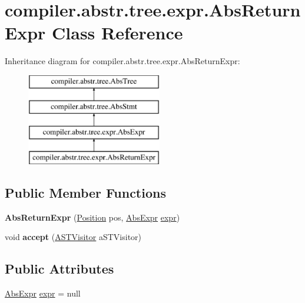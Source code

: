 \hypertarget{classcompiler_1_1abstr_1_1tree_1_1expr_1_1_abs_return_expr}{}\section{compiler.\+abstr.\+tree.\+expr.\+Abs\+Return\+Expr Class Reference}
\label{classcompiler_1_1abstr_1_1tree_1_1expr_1_1_abs_return_expr}
Inheritance diagram for compiler.\+abstr.\+tree.\+expr.\+Abs\+Return\+Expr\+:\begin{figure}[H]
\begin{center}
\leavevmode
\includegraphics[height=4.000000cm]{classcompiler_1_1abstr_1_1tree_1_1expr_1_1_abs_return_expr}
\end{center}
\end{figure}
\subsection*{Public Member Functions}
\begin{DoxyCompactItemize}
\item 
\mbox{\label{classcompiler_1_1abstr_1_1tree_1_1expr_1_1_abs_return_expr_a4819f0ee01d5144b0a08935324ccbe23}} 
{\bfseries Abs\+Return\+Expr} (\hyperlink{classcompiler_1_1_position}{Position} pos, \hyperlink{classcompiler_1_1abstr_1_1tree_1_1expr_1_1_abs_expr}{Abs\+Expr} \hyperlink{classcompiler_1_1abstr_1_1tree_1_1expr_1_1_abs_return_expr_a36d1a109ae9d447640d861844e5fc1c5}{expr})
\item 
\mbox{\label{classcompiler_1_1abstr_1_1tree_1_1expr_1_1_abs_return_expr_ac02d522687a6c561b68bb8891908b81f}} 
void {\bfseries accept} (\hyperlink{interfacecompiler_1_1abstr_1_1_a_s_t_visitor}{A\+S\+T\+Visitor} a\+S\+T\+Visitor)
\end{DoxyCompactItemize}
\subsection*{Public Attributes}
\begin{DoxyCompactItemize}
\item 
\hyperlink{classcompiler_1_1abstr_1_1tree_1_1expr_1_1_abs_expr}{Abs\+Expr} \hyperlink{classcompiler_1_1abstr_1_1tree_1_1expr_1_1_abs_return_expr_a36d1a109ae9d447640d861844e5fc1c5}{expr} = null
\end{DoxyCompactItemize}



